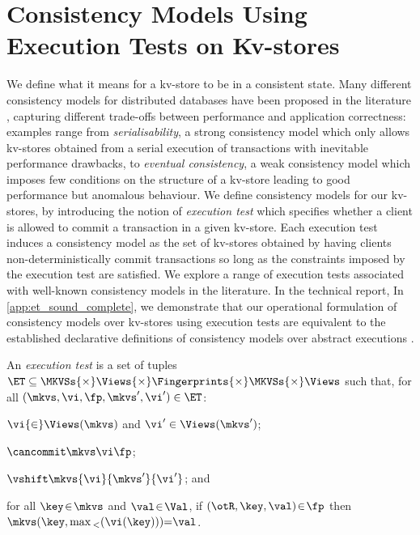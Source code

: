 \section{Consistency Models Using Execution Tests on Kv-stores}
\label{sec:cm}
We define what it means for a kv-store 
to be in a consistent state. Many different consistency models for
distributed databases have 
been proposed in the literature
\cite{gdur,ramp,CORFU,tango,si,distrsi,clocksi,redblue,rola,cops,PSI-RA,NMSI,PSI,wren},
capturing different trade-offs 
between  performance and application
correctness: examples range from  \emph{serialisability}, a strong
consistency model which only allows kv-stores 
obtained  from a serial execution of transactions
with inevitable performance drawbacks, to  \emph{eventual consistency},  a weak consistency model
which imposes few conditions on the structure of a kv-store leading to
good performance but anomalous behaviour.
We define consistency models for our kv-stores,
by introducing the notion of 
\emph{execution test} which specifies  whether a client is allowed to commit a transaction in a given 
kv-store. Each execution test induces a consistency model as the set of kv-stores obtained 
by having clients non-deterministically commit transactions so long as  the constraints 
imposed by the execution test are satisfied.
We explore a range of execution tests  associated with well-known consistency models in the literature. 
\ifTechRepEdits%
In the technical report,
\else%
In \cref{app:et_sound_complete},
\fi
we demonstrate that our operational
formulation of  consistency models over kv-stores using execution
tests are  equivalent to the established declarative definitions of
consistency models over abstract executions \cite{ev_transactions,framework-concur}.

\SpaceAboveDef
\begin{definition}
\label{def:execution.test}
An \emph{execution test} is a set of tuples
\(\ET \subseteq \MKVSs {\times} \Views {\times} \allowbreak \Fingerprints {\times} \MKVSs {\times} \Views\) 
such that, for all \((\mkvs, \vi, \fp, \mkvs', \vi') \in \ET\): 
\begin{enumerate*}
	\item \(\vi {\in}  \allowbreak \Views(\mkvs)\) and \(\vi' \in \Views(\mkvs')\); 
	\item \(\cancommit \mkvs \vi \fp\); 
	\item \(\vshift \mkvs {\allowbreak \vi} {\mkvs'} {\vi'}\); and 
	\item for all \(\key \!\in\! \mkvs\) and \(\val \!\in\! \Val\), if \((\otR, \key, \val) \!\in\! \fp \) then \(	\mkvs(\key, \max{}_{<}(\vi(\key))) {=} \val   \).
\end{enumerate*}
\end{definition}
\SpaceBelowDef

